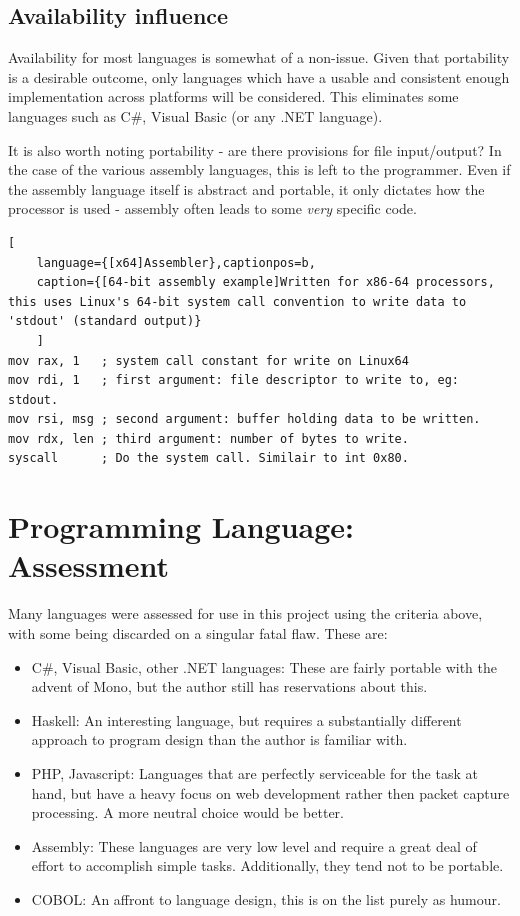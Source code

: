\documentclass[10pt,a4paper,notitlepage,twoside]{report}
\begin{document}
\subsection{Availability influence}
Availability for most languages is somewhat of a non-issue. Given that portability is a desirable outcome, only languages which have a usable and consistent enough implementation across platforms will be considered. This eliminates some languages such as C\#, Visual Basic (or any .NET language).

It is also worth noting portability - are there provisions for file input/output? In the case of the various assembly languages, this is left to the programmer. Even if the assembly language itself is abstract and portable, it only dictates how the processor is used - assembly often leads to some \emph{very} specific code.

\begin{lstlisting}[
	language={[x64]Assembler},captionpos=b,
	caption={[64-bit assembly example]Written for x86-64 processors, this uses Linux's 64-bit system call convention to write data to 'stdout' (standard output)}
	]
mov rax, 1   ; system call constant for write on Linux64
mov rdi, 1   ; first argument: file descriptor to write to, eg: stdout.
mov rsi, msg ; second argument: buffer holding data to be written.
mov rdx, len ; third argument: number of bytes to write.
syscall      ; Do the system call. Similair to int 0x80.
\end{lstlisting}

\section{Programming Language: Assessment}
Many languages were assessed for use in this project using the criteria above, with some being discarded on a singular fatal flaw. These are:
\begin{itemize}
\item C\#, Visual Basic, other .NET languages: These are fairly portable with the advent of Mono\cite{mono}, but the author still has reservations about this.
\item Haskell: An interesting language, but requires a substantially different approach to program design than the author is familiar with.
\item PHP, Javascript: Languages that are perfectly serviceable for the task at hand, but have a heavy focus on web development rather then packet capture processing. A more neutral choice would be better.
\item Assembly: These languages are very low level and require a great deal of effort to accomplish simple tasks. Additionally, they tend not to be portable.
\item COBOL: An affront to language design, this is on the list purely as humour.
\end{itemize}
\end{document}
